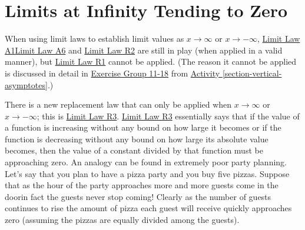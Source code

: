 \documentclass[10pt,oneside,]{book}
\theoremstyle{plain}
\theoremstyle{definition}
\numberwithin{equation}{section}
\begin{document}
\section[Limits at Infinity Tending to Zero]{Limits at Infinity Tending to Zero}\label{section-limits-at-infinity-tending-to-zero}
When using limit laws to establish limit values as \(x\to\infty\) or \(x\to-\infty\), \hyperref[lla1]{Limit Law A1}\textendash{}\hyperref[lla6]{Limit Law A6} and  \hyperref[llr2]{Limit Law R2} are still in play (when applied in a valid manner), but \hyperref[llr1]{Limit Law R1} cannot be applied. (The reason it cannot be applied is discussed in detail in \hyperlink{exercisegroup-hear-me}{Exercise Group 11-18} from \hyperref[section-vertical-asymptotes]{Activity \ref{section-vertical-asymptotes}}.)%
\par
There is a new replacement law that can only be applied when \(x\to\infty\) or \(x\to-\infty\); this is \hyperref[llr3]{Limit Law R3}. \hyperref[llr3]{Limit Law R3} essentially says that if the value of a function is increasing without any bound on how large it becomes or if the function is decreasing without any bound on how large its absolute value becomes, then the value of a constant divided by that function must be approaching zero. An analogy can be found in extremely poor party planning. Let's say that you plan to have a pizza party and you buy five pizzas. Suppose that as the hour of the party approaches more and more guests come in the door\textemdash{}in fact the guests never stop coming! Clearly as the number of guests continues to rise the amount of pizza each guest will receive quickly approaches zero (assuming the pizzas are equally divided among the guests).%
\typeout{************************************************}
\typeout{************************************************}
\end{document}
